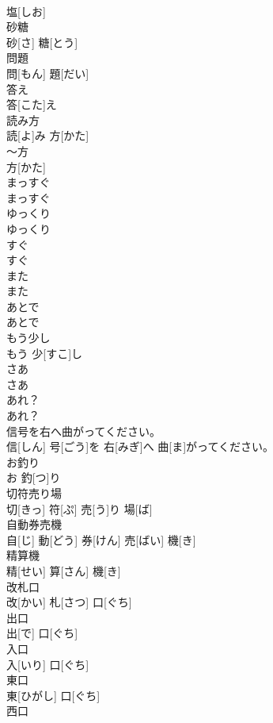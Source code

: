 \documentclass[8pt]{extreport}
\begin{document}
\begin{CJK}{UTF8}{min}
\\	塩[しお]		
\\	砂糖	
\\	砂[さ] 糖[とう]		
\\	問題	
\\	問[もん] 題[だい]		
\\	答え	
\\	答[こた]え		
\\	読み方	
\\	読[よ]み 方[かた]		
\\	～方	
\\	方[かた]		
\\	まっすぐ	
\\	まっすぐ		
\\	ゆっくり	
\\	ゆっくり		
\\	すぐ	
\\	すぐ		
\\	また	
\\	また		
\\	あとで	
\\	あとで		
\\	もう少し	
\\	もう 少[すこ]し		
\\	さあ	
\\	さあ		
\\	あれ？	
\\	あれ？		
\\	信号を右へ曲がってください。	
\\	信[しん] 号[ごう]を 右[みぎ]へ 曲[ま]がってください。		
\\	お釣り	
\\	お 釣[つ]り		
\\	切符売り場	
\\	切[きっ] 符[ぷ] 売[う]り 場[ば]		
\\	自動券売機	
\\	自[じ] 動[どう] 券[けん] 売[ばい] 機[き]		
\\	精算機	
\\	精[せい] 算[さん] 機[き]		
\\	改札口	
\\	改[かい] 札[さつ] 口[ぐち]		
\\	出口	
\\	出[で] 口[ぐち]		
\\	入口	
\\	入[いり] 口[ぐち]		
\\	東口	
\\	東[ひがし] 口[ぐち]		
\\	西口	

\end{CJK}
\end{document}
